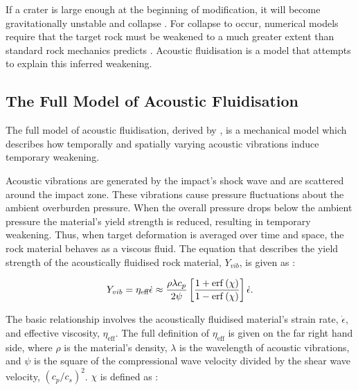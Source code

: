 If a crater is large enough at the beginning of modification, it will become gravitationally unstable and collapse \citetext{e.g., \citet{melosh1999impact}}. For collapse to occur, numerical models require that the target rock must be weakened to a much greater extent than standard rock mechanics predicts \citep{mckinnon1978investigation}. Acoustic fluidisation \citep{melosh1979acoustic} is a model that attempts to explain this inferred weakening.

\subsection{The Full Model of Acoustic Fluidisation \label{sec:acfl}}

The full model of acoustic fluidisation, derived by \citet{melosh1979acoustic}, is a mechanical model which describes how temporally and spatially varying acoustic vibrations induce temporary weakening.

Acoustic vibrations are generated by the impact's shock wave and are scattered around the impact zone. These vibrations cause pressure fluctuations about the ambient overburden pressure. When the overall pressure drops below the ambient pressure the material's yield strength is reduced, resulting in temporary weakening. Thus, when target deformation is averaged over time and space, the rock material behaves as a viscous fluid. The equation that describes the yield strength of the acoustically fluidised rock material, $Y_{vib}$, is given as \citep{collins2003acoustic}:

\vspace{-0.1cm}
\begin{equation} \label{eq:yield_vib}
Y_{vib} = \eta_{\text{eff}} \dot{\epsilon} \approx  \frac{\rho \lambda c_{p}}{2 \psi} \left[ \frac{1+\erf\left(\chi\right)}{1-\erf\left(\chi\right)} \right] \dot{\epsilon}.\vspace{0.2cm}
\end{equation} 

The basic relationship involves the acoustically fluidised material's strain rate, $\dot{\epsilon}$, and effective viscosity, $\eta_{\text{eff}}$. The full definition of $\eta_{\text{eff}}$ is given on the far right hand side, where $\rho$ is the material's density, $\lambda$ is the wavelength of acoustic vibrations, and $\psi$ is the square of the compressional wave velocity divided by the shear wave velocity, $(c_{p}/c_{s})^{2}$. $\chi$ is defined as \citep{collins2002numerical}: 

